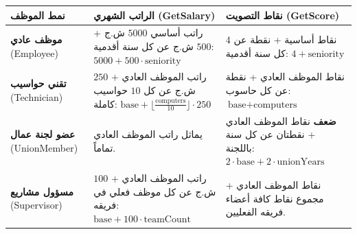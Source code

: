 \documentclass[14pt]{extarticle}
\begin{document}
{\renewcommand{\arraystretch}{1.4}
\small
\begin{longtable}{|p{}|p{}|p{}|}
\hline
\textbf{نمط الموظف} & \textbf{الراتب الشهري (\textenglish{GetSalary})} & \textbf{نقاط التصويت (\textenglish{GetScore})} \\
\hline
\textbf{موظف عادي} \newline (\textenglish{Employee}) &
راتب أساسي $5000$ ش.ج + $500$ ش.ج عن كل سنة أقدمية: \newline
$5000 + 500 \cdot \text{seniority}$ &
$4$ نقاط أساسية + نقطة عن كل سنة أقدمية: \newline
$4 + \text{seniority}$ \\
\hline
\textbf{تقني حواسيب} \newline (\textenglish{Technician}) &
راتب الموظف العادي + $250$ ش.ج عن كل $10$ حواسيب كاملة: \newline
$\text{base} + \lfloor \frac{\text{computers}}{10} \rfloor \cdot 250$ &
نقاط الموظف العادي + نقطة عن كل حاسوب: \newline
$\text{base} + \text{computers}$ \\
\hline
\textbf{عضو لجنة عمال} \newline (\textenglish{UnionMember}) &
يماثل راتب الموظف العادي تماماً. &
\textbf{ضعف} نقاط الموظف العادي + نقطتان عن كل سنة باللجنة: \newline
$2 \cdot \text{base} + 2 \cdot \text{unionYears}$ \\
\hline
\textbf{مسؤول مشاريع} \newline (\textenglish{Supervisor}) &
راتب الموظف العادي + $100$ ش.ج عن كل موظف فعلي في فريقه: \newline
$\text{base} + 100 \cdot \text{teamCount}$ &
نقاط الموظف العادي + مجموع نقاط كافة أعضاء فريقه الفعليين. \\
\hline
\end{longtable}}

\vspace{1em}
\end{document}
